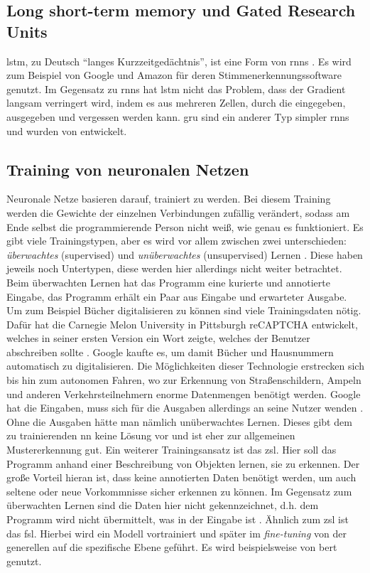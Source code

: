 \subsection{Long short-term memory und Gated Research Units}\label{sub:lstm}
\ac{lstm}, zu Deutsch \enquote{langes Kurzzeitgedächtnis}, ist eine Form von \acp{rnn} \citep{lstm}.
Es wird zum Beispiel von Google und Amazon für deren Stimmenerkennungssoftware genutzt.
Im Gegensatz zu \acp{rnn} hat \ac{lstm} nicht das Problem, dass der Gradient langsam verringert wird,
indem es aus mehreren Zellen, durch die eingegeben, ausgegeben und vergessen werden kann.
\ac{gru} sind ein anderer Typ simpler \acp{rnn} und wurden von \citet{gru} entwickelt.

\subsection{Training von neuronalen Netzen}
Neuronale Netze basieren darauf, trainiert zu werden.
Bei diesem Training werden die Gewichte der einzelnen Verbindungen zufällig verändert, sodass am Ende selbst die programmierende Person nicht weiß, wie genau es funktioniert.
Es gibt viele Trainingstypen, aber es wird vor allem zwischen zwei unterschieden: \emph{überwachtes} (supervised) und \emph{unüberwachtes} (unsupervised) Lernen \citep{mllearning}.
Diese haben jeweils noch Untertypen, diese werden hier allerdings nicht weiter betrachtet.
Beim überwachten Lernen hat das Programm eine kurierte und annotierte Eingabe, das Programm erhält ein Paar aus Eingabe und erwarteter Ausgabe.
Um zum Beispiel Bücher digitalisieren zu können sind viele Trainingsdaten nötig.
Dafür hat die Carnegie Melon University in Pittsburgh reCAPTCHA entwickelt, welches in seiner ersten Version ein Wort zeigte, welches der Benutzer abschreiben sollte \citep{recaptchabooks}.
Google kaufte es, um damit Bücher und Hausnummern automatisch zu digitalisieren.
Die Möglichkeiten dieser Technologie erstrecken sich bis hin zum autonomen Fahren, wo zur Erkennung von Straßenschildern, Ampeln und anderen Verkehrsteilnehmern enorme Datenmengen benötigt werden.
Google hat die Eingaben, muss sich für die Ausgaben allerdings an seine Nutzer wenden \citep{recaptchaav}.
Ohne die Ausgaben hätte man nämlich unüberwachtes Lernen.
Dieses gibt dem zu trainierenden \ac{nn} keine Lösung vor und ist eher zur allgemeinen Mustererkennung gut.
Ein weiterer Trainingsansatz ist das \ac{zsl}.
Hier soll das Programm anhand einer Beschreibung von Objekten lernen, sie zu erkennen.
Der große Vorteil hieran ist, dass keine annotierten Daten benötigt werden, um auch seltene oder neue Vorkommnisse sicher erkennen zu können.
Im Gegensatz zum überwachten Lernen sind die Daten hier nicht gekennzeichnet, d.h. dem Programm wird nicht übermittelt, was in der Eingabe ist \citep{zsl}.
Ähnlich zum \ac{zsl} ist das \ac{fsl}.
Hierbei wird ein Modell vortrainiert und später im \emph{fine-tuning} von der generellen auf die spezifische Ebene geführt.
Es wird beispielsweise von \ac{bert} genutzt.

